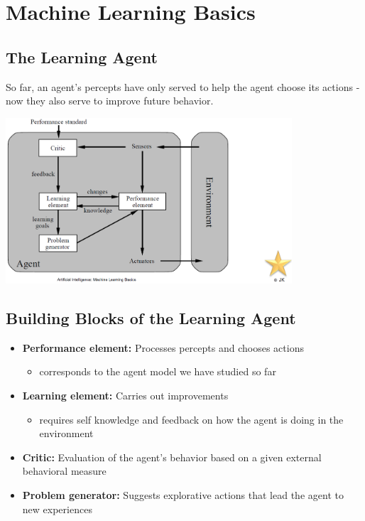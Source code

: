 \documentclass[conference]{styles/acmsiggraph}
\begin{document}
    
    
    
    
    

\section{Machine Learning Basics}
    
    \subsection{The Learning Agent}
        So far, an agent's percepts have only served to help the agent choose its actions -now they also serve to improve future behavior.\newline
        
        \includegraphics[width=0.8\textwidth]{imgs/TheLearningAgent.png}\newline
        
    \subsection{Building Blocks of the Learning Agent}
        \begin{itemize}
            \item \textbf{Performance element:} Processes percepts and chooses actions
            \begin{itemize}
                \item corresponds to the agent model we have studied so far
            \end{itemize}
            \item \textbf{Learning element:} Carries out improvements
            \begin{itemize}
                \item requires self knowledge and feedback on how the agent is doing in the environment
            \end{itemize}
            \item \textbf{Critic:} Evaluation of the agent's behavior based on a given external behavioral measure
            \item \textbf{Problem generator:} Suggests explorative actions that lead the agent to new experiences
        \end{itemize}
    
\end{document}
